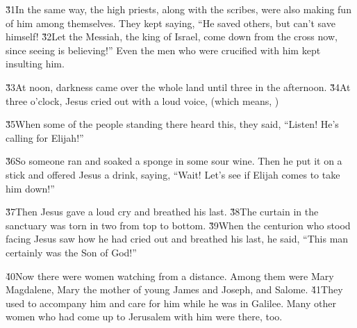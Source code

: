 \v{31}In the same way, the high priests, along with the scribes, were also making fun of him among themselves. They kept saying, ``He saved others, but can't save himself! \v{32}Let the Messiah, the king of Israel, come down from the cross now, since seeing is believing!'' Even the men who were crucified with him kept insulting him.

\v{33}At noon, darkness came over the whole land until three in the afternoon. \v{34}At three o'clock, Jesus cried out with a loud voice,  (which means, )

\v{35}When some of the people standing there heard this, they said, ``Listen! He's calling for Elijah!''

\v{36}So someone ran and soaked a sponge in some sour wine. Then he put it on a stick and offered Jesus a drink, saying, ``Wait! Let's see if Elijah comes to take him down!''

\v{37}Then Jesus gave a loud cry and breathed his last. \v{38}The curtain in the sanctuary was torn in two from top to bottom. \v{39}When the centurion who stood facing Jesus saw how he had cried out and breathed his last, he said, ``This man certainly was the Son of God!''

\v{40}Now there were women watching from a distance. Among them were Mary Magdalene, Mary the mother of young James and Joseph, and Salome. \v{41}They used to accompany him and care for him while he was in Galilee. Many other women who had come up to Jerusalem with him were there, too.

